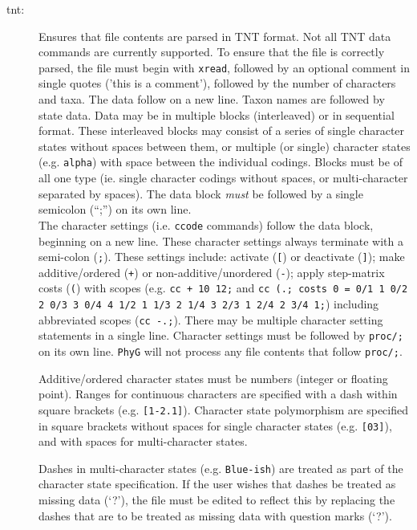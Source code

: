 \begin{description}
		\item [tnt:] Ensures that file contents are parsed in TNT \citep{Goloboffetal2008} format. 
		Not all TNT data commands are currently supported. To ensure that the file is correctly
		parsed, the file must begin with \texttt{xread}, followed by an optional comment in single 
		quotes ('this is a comment'), followed by the number of characters and taxa. The data 
		follow on a new line. Taxon names are followed by state data. Data may be in multiple 
		blocks (interleaved) or in sequential format. These interleaved blocks may consist of a 
		series of single character states without spaces between them, or multiple (or single) 
		character states (e.g. \texttt{alpha}) with space between the individual codings. Blocks 
		must be of all one type (ie. single character codings without spaces, or multi-character 
		separated by spaces). The data block \textit{must} be followed by a single semicolon 
		(``;'') 	on its own line.\\
			
		The character settings (i.e. \texttt{ccode} commands) follow the data block, beginning 
		on a 	new line. These character settings always terminate with a semi-colon (\texttt{;}). 
		These settings include: activate (\texttt{[}) or deactivate (\texttt{]}); make additive/ordered 
		(\texttt{+}) 	or non-additive/unordered (\texttt{-}); apply step-matrix costs (\texttt{(}) with 
		scopes (e.g. \texttt{cc + 10 12;} and  \texttt{cc (.; costs 0 = 0/1 1 0/2 2 0/3 3 0/4 4 1/2 1 
		1/3 2 1/4 3 2/3 1 2/4 2 3/4 1;}) including abbreviated scopes (\texttt{cc -.;}). %
		There may 
		be multiple character setting statements in a single line. Character settings must be 
		followed by \texttt{proc/;} on its own line. \texttt{PhyG} will not process
		any file contents that follow \texttt{proc/;}.
		  
		 Additive/ordered character states must be numbers (integer or floating point). Ranges 
		 for continuous characters are specified with a dash within square brackets (e.g. 
		 \texttt{[1-2.1]}). Character state polymorphism are specified in square brackets without 
		 spaces for single character states (e.g. \texttt{[03]}), and with spaces for multi-character 
		 states. %
		  
		 Dashes in multi-character states (e.g. \texttt{Blue-ish}) 
		 are treated as part of the character state specification. If the user wishes that dashes 
		 be treated as missing data (`?'), the file must be edited to reflect this by replacing the 
		 dashes that are to be treated as missing data with question 
		 marks (`?').
		  

\end{description}
